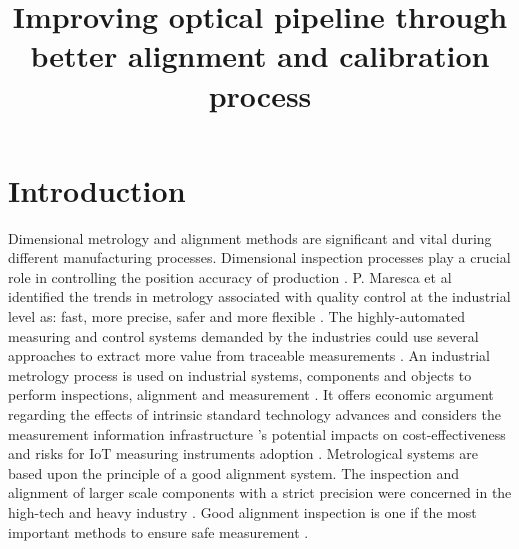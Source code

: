 \documentclass[10pt,a4paper,onecolumn]{article}
\begin{document}
	
	\title{Improving optical pipeline through better alignment and calibration process}
	
\maketitle

\section{Introduction}
\label{intro}
Dimensional metrology and alignment methods are significant and vital during different manufacturing processes. Dimensional inspection processes play a crucial role in controlling the position accuracy of production \cite{gu2020study}. P. Maresca et al identified the trends in metrology associated with quality control at the industrial level as: fast, more precise, safer and more flexible \cite{maresca2019evaluation}. The highly-automated measuring and control systems demanded by the industries could use several approaches to extract more value from traceable measurements \cite{hall2019opportunity}. An industrial metrology process is used on industrial systems, components and objects to perform inspections, alignment and measurement \cite{moru2020machine}. It offers economic argument regarding the effects of intrinsic standard technology advances and considers the measurement information infrastructure 's potential impacts on cost-effectiveness and risks for IoT measuring instruments adoption \cite{kuster2020measurement}. Metrological systems are based upon the principle of a good alignment system. The inspection and alignment of larger scale components with a strict precision were concerned in the high-tech and heavy industry \cite{gu2020study}. Good alignment inspection is one if the most important methods to ensure safe measurement \cite{peng2020inertia}.

\newpage



    
\end{document}
